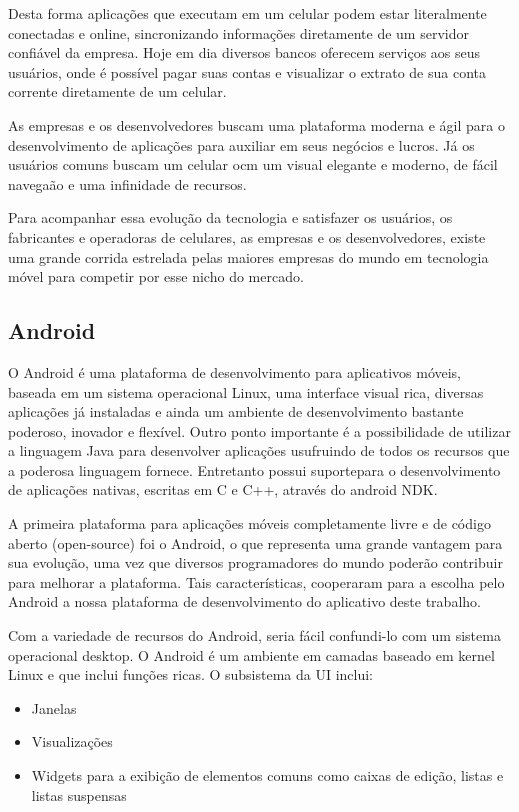\documentclass[12pt, %
openright, 
oneside, %
a4paper,    %
brazil]{facom-ufu-abntex2}
\begin{document}
Desta forma aplicações que executam em um celular podem estar literalmente conectadas e online, sincronizando informações diretamente de um servidor confiável da empresa. Hoje em dia diversos bancos oferecem serviços aos seus usuários, onde é possível pagar suas contas e visualizar o extrato de sua conta corrente diretamente de um celular.

As empresas e os desenvolvedores buscam uma plataforma moderna e ágil para o desenvolvimento de aplicações para auxiliar em seus negócios e lucros. Já os usuários comuns buscam um celular ocm um visual elegante e moderno, de fácil navegaão e uma infinidade de recursos.

Para acompanhar essa evolução da tecnologia e satisfazer os usuários, os fabricantes e operadoras de celulares, as empresas e os desenvolvedores, existe uma grande corrida estrelada pelas maiores empresas do mundo em tecnologia móvel para competir por esse nicho do mercado.\cite{googleand}




\subsection{Android}
O Android é uma plataforma de desenvolvimento para aplicativos móveis, baseada em um sistema operacional Linux, uma interface visual rica, diversas aplicações já instaladas e ainda um ambiente de desenvolvimento bastante poderoso, inovador e flexível. Outro ponto importante é a possibilidade de utilizar a linguagem Java para desenvolver aplicações usufruindo de todos os recursos que a poderosa linguagem fornece. Entretanto possui suportepara o desenvolvimento de aplicações nativas, escritas em C e C++, através do android NDK. \cite{googleand}

A primeira plataforma para aplicações móveis completamente livre e de código aberto (open-source) foi o Android, o que representa uma grande vantagem para sua evolução, uma vez que diversos programadores do mundo poderão contribuir para melhorar a plataforma. Tais características, cooperaram para a escolha pelo Android a nossa plataforma de desenvolvimento do aplicativo deste trabalho.

Com a variedade de recursos do Android, seria fácil confundi-lo com um sistema operacional desktop. O Android é um ambiente em camadas baseado em kernel Linux e que inclui funções ricas. O subsistema da UI inclui:
\begin{itemize}
\item Janelas
\item Visualizações
\item Widgets para a exibição de elementos comuns como caixas de edição, listas e listas suspensas
\end{itemize}
\end{document}
